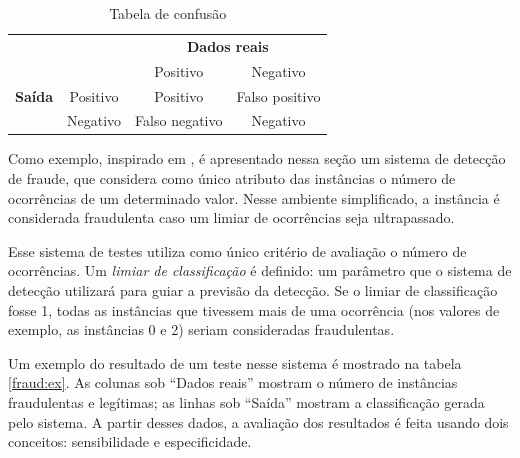 \renewcommand{\arraystretch}{1.5}
\begin{table}[h!]
    \vspace{1cm}
    \caption{Tabela de confusão}
    \centering
    \begin{tabular}{c l c c}
        & & \multicolumn{2}{c}{\textbf{Dados reais}} \\
        \multirow{3}{5mm}{\begin{sideways}\parbox{20mm}{\textbf{Saída}}\end{sideways}} & \multicolumn{1}{c|}{} & Positivo & Negativo \\
        \cline{2-4}
        & \multicolumn{1}{c|}{Positivo} & Positivo & Falso positivo\\
        & \multicolumn{1}{c|}{Negativo} & Falso negativo & Negativo\\
    \end{tabular}
    \label{fraud:confusion}
    \vspace{1cm}
\end{table}

Como exemplo, inspirado em \citet{Bewick2004}, é apresentado nessa seção um sistema de detecção de fraude, que considera como único atributo das instâncias o número de ocorrências de um determinado valor. Nesse ambiente simplificado, a instância é considerada fraudulenta caso um limiar de ocorrências seja ultrapassado.

Esse sistema de testes utiliza como único critério de avaliação o número de ocorrências. Um \emph{limiar de classificação} é definido: um parâmetro que o sistema de detecção utilizará para guiar a previsão da detecção. Se o limiar de classificação fosse 1, todas as instâncias que tivessem mais de uma ocorrência (nos valores de exemplo, as instâncias 0 e 2) seriam consideradas fraudulentas.

Um exemplo do resultado de um teste nesse sistema é mostrado na tabela \ref{fraud:ex}. As colunas sob ``Dados reais'' mostram o número de instâncias fraudulentas e legítimas; as linhas sob ``Saída'' mostram a classificação gerada pelo sistema. A partir desses dados, a avaliação dos resultados é feita usando dois conceitos: sensibilidade e especificidade.

